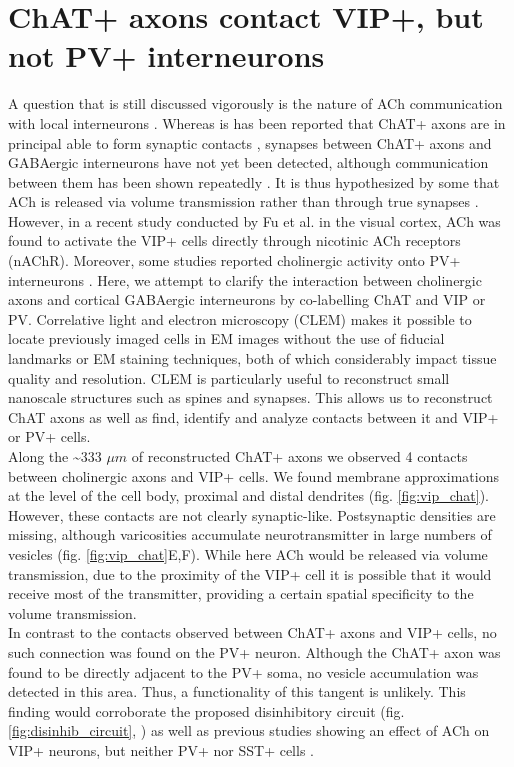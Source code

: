 \section{ChAT+ axons contact VIP+, but not PV+ interneurons}
\label{sec:chat_gaba}
A question that is still discussed vigorously is the nature of ACh communication with local interneurons \citep{Sarter2009}. Whereas is has been reported that ChAT+ axons are in principal able to form synaptic contacts \citep{Turrini2001}, synapses between ChAT+ axons and GABAergic interneurons have not yet been detected, although communication between them has been shown repeatedly \citep{Wanaverbecq2007,Pfeffer2013,Fu2014,Letzkus2011}. It is thus hypothesized by some that ACh is released via volume transmission rather than through true synapses \citep{Descarries1997}. However, in a recent study conducted by Fu et al. \citeyear{Fu2014} in the visual cortex, ACh was found to activate the VIP+ cells directly through nicotinic ACh receptors (nAChR). Moreover, some studies reported cholinergic activity onto PV+ interneurons \citep{Letzkus2011}. Here, we attempt to clarify the interaction between cholinergic axons and cortical GABAergic interneurons by co-labelling ChAT and VIP or PV. Correlative light and electron microscopy (CLEM) makes it possible to locate previously imaged cells in EM images without the use of fiducial landmarks or EM staining techniques, both of which considerably impact tissue quality and resolution. CLEM is particularly useful to reconstruct small nanoscale structures such as spines and synapses. This allows us to reconstruct ChAT axons as well as find, identify and analyze contacts between it and VIP+ or PV+ cells.\\
Along the \textasciitilde 333 $\mu m$ of reconstructed ChAT+ axons we observed 4 contacts between cholinergic axons and VIP+ cells. We found membrane approximations at the level of the cell body, proximal and distal dendrites (fig. \ref{fig:vip_chat}). However, these contacts are not clearly synaptic-like. Postsynaptic densities are missing, although varicosities accumulate neurotransmitter in large numbers of vesicles (fig. \ref{fig:vip_chat}E,F). While here ACh would be released via volume transmission, due to the proximity of the VIP+ cell it is possible that it would receive most of the transmitter, providing a certain spatial specificity to the volume transmission.\\
In contrast to the contacts observed between ChAT+ axons and VIP+ cells, no such connection was found on the PV+ neuron. Although the ChAT+ axon was found to be directly adjacent to the PV+ soma, no vesicle accumulation was detected in this area. Thus, a functionality of this tangent is unlikely. This finding would corroborate the proposed disinhibitory circuit (fig. \ref{fig:disinhib_circuit}, \cite{Pfeffer2013}) as well as previous studies showing an effect of ACh on VIP+ neurons, but neither PV+ nor SST+ cells \citep{Alitto2013}.


